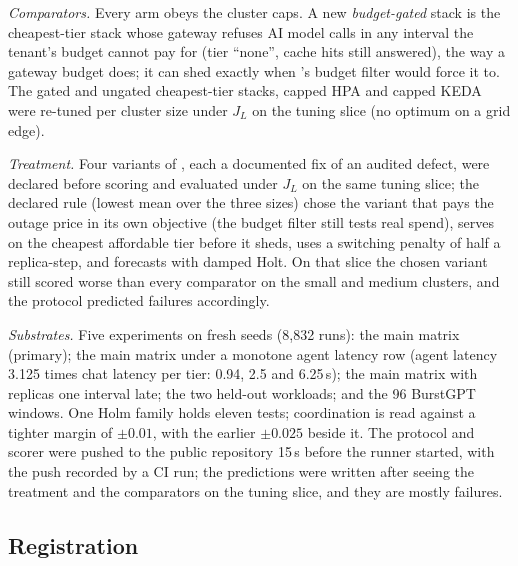 \emph{Comparators.} Every arm obeys the cluster caps. A new
\emph{budget-gated} stack is the cheapest-tier stack whose gateway refuses AI
model calls in any interval the tenant's budget cannot pay for (tier
``none'', cache hits still answered), the way a gateway budget does; it can
shed exactly when \jcac{}'s budget filter would force it to. The gated and
ungated cheapest-tier stacks, capped HPA and capped KEDA were re-tuned per
cluster size under $J_L$ on the tuning slice (no optimum on a grid edge).

\emph{Treatment.} Four variants of \jcac{}, each a documented fix of an
audited defect, were declared before scoring and evaluated under $J_L$ on the
same tuning slice; the declared rule (lowest mean over the three sizes)
chose the variant that pays the outage price in its own objective (the
budget filter still tests real spend), serves on the cheapest affordable
tier before it sheds, uses a switching penalty of half a replica-step, and
forecasts with damped Holt. On that slice the chosen variant still scored
worse than every comparator on the small and medium clusters, and the
protocol predicted failures accordingly.

\emph{Substrates.} Five experiments on fresh seeds (8,832 runs): the main
matrix (primary); the main matrix under a monotone agent latency row (agent
latency 3.125 times chat latency per tier: 0.94, 2.5 and 6.25\,s); the main
matrix with replicas one interval late; the two held-out workloads; and the
96 BurstGPT windows. One Holm family holds eleven tests; coordination is read
against a tighter margin of $\pm0.01$, with the earlier $\pm0.025$ beside it.
The protocol and scorer were pushed to the public repository 15\,s before
the runner started, with the push recorded by a CI run; the predictions
were written after seeing the treatment and the comparators on the tuning
slice, and they are mostly failures.

\subsection{Registration}
\label{sec:prereg}

